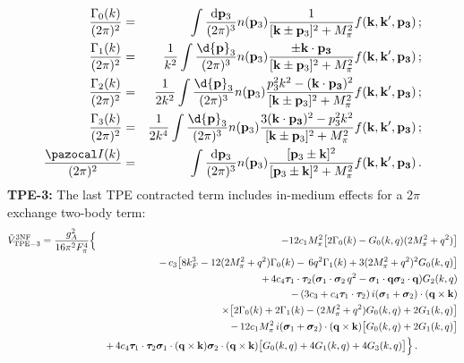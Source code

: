 \begin{eqnarray}
\label{gamma0}
\frac{\Gamma_0(k)}{(2\pi)^2}&=& \qquad \int\frac{{\mathrm d}{\bf p}_3}{(2\pi)^3}n({\bf p}_3)
\frac{1}{[{\bf k}\pm{\bf p}_3]^2 + M_\pi^2}f({\bf k},{\bf k'},{\bf p_3})\,;
\\ \label{gamma1}
\frac{\Gamma_1(k)}{(2\pi)^2}&=&\frac{1}{k^2}\int\frac{\d{\bf p}_3}{(2\pi)^3}n({\bf p}_3)
\frac{\pm{\bf k}\cdot{\bf p_3}}{[{\bf k}\pm{\bf p}_3]^2 + M_\pi^2}f({\bf k},{\bf k'},{\bf p_3})\,;
\\ \label{gamma2}
\frac{\Gamma_2(k)}{(2\pi)^2}&=&\frac{1}{2k^2}\int\frac{\d{\bf p}_3}{(2\pi)^3}n({\bf p}_3)
\frac{p_3^2k^2-({\bf k}\cdot{\bf p_3})^2}{[{\bf k}\pm{\bf p}_3]^2 + M_\pi^2}f({\bf k},{\bf k'},{\bf p_3})\,;
\\ \label{gamma3}
\frac{\Gamma_3(k)}{(2\pi)^2}&=&\frac{1}{2k^4}\int\frac{\d{\bf p}_3}{(2\pi)^3}n({\bf p}_3)
\frac{3({\bf k}\cdot{\bf p_3})^2-p_3^2k^2}{[{\bf k}\pm{\bf p}_3]^2 + M_\pi^2}f({\bf k},{\bf k'},{\bf p_3})\,;
\\ \label{i_integral}
\frac{{\pazocal I}(k)}{(2\pi)^2}&=& \qquad  \int \frac{{\mathrm d}{\bf p}_3}{(2\pi)^3}n({\bf p}_3)
\frac{[{\bf p}_3\pm{\bf k}]^2}{[{\bf p}_3\pm{\bf k}]^2 + M_\pi^2}f({\bf k},{\bf k'},{\bf p_3})\,.
\end{eqnarray}
\noindent
{\bf TPE-3:} The last TPE contracted term includes in-medium effects for a 2$\pi$ exchange two-body term:
\begin{eqnarray}
\nonumber 
\tilde V_\mathrm{TPE-3}^\mathrm{3NF} = \frac{g_A^2}{16\pi^2F_\pi^4}
  &\Big\{ & -12c_1M_\pi^2\big[2\Gamma_0(k)-G_0(k,q)(2M_\pi^2+q^2)\big]
\\\nonumber &&   %
- \, c_3\big[8k_F^3-12(2M_\pi^2+q^2)\Gamma_0(k)
- \, 6q^2\Gamma_1(k)+3(2M_\pi^2+q^2)^2G_0(k,q)\big] 
\\\nonumber &&  %
+  \, 4c_4 \boldsymbol\tau_1\cdot\boldsymbol\tau_2(\boldsymbol\sigma_1\cdot\boldsymbol\sigma_2\, q^2-\boldsymbol\sigma_1\cdot{\bf q}\boldsymbol\sigma_2\cdot{\bf q})
G_2(k,q)
\\\nonumber &&  %
-\, (3c_3+c_4\boldsymbol\tau_1\cdot\boldsymbol\tau_2)\,i(\boldsymbol\sigma_1+\boldsymbol\sigma_2)\cdot({\bf q}\times{\bf k})
\\\nonumber &&  \qquad \qquad \qquad \qquad \times
\big[2\Gamma_0(k)+2\Gamma_1(k)-(2M_\pi^2+q^2)G_0(k,q)+2G_1(k,q)\big]
\\\nonumber &&  %
- \, 12c_1M_\pi^2\,  i(\boldsymbol\sigma_1+\boldsymbol\sigma_2)\cdot({\bf q}\times{\bf k})
\big[G_0(k,q)+2G_1(k,q)\big]
\\ &&  %
+ \, 4c_4\boldsymbol\tau_1\cdot\boldsymbol\tau_2\boldsymbol\sigma_1\cdot({\bf q}\times{\bf k})\boldsymbol\sigma_2\cdot({\bf q}\times{\bf k})
\big[G_0(k,q)+4G_1(k,q)+4G_3(k,q)\big]\Big\} \,. \qquad \qquad 
\label{tpe_dd_3}
\end{eqnarray}
